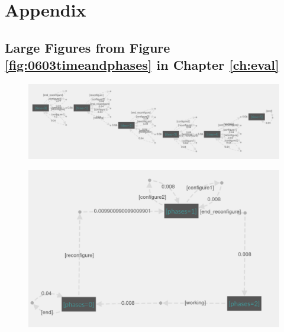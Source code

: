 \documentclass[preview]{standalone}
\begin{document}
\section{Appendix}
\subsection[Figures Large]{Large Figures from Figure \ref{fig:0603timeandphases} in Chapter \ref{ch:eval}}

\begin{figure}[!htb]
	\includegraphics[width=\textwidth]{./06/images/06_03_time.png}
\end{figure}

\begin{figure}[!htb]
	\includegraphics[width=\textwidth]{./06/images/06_03_phases.png}
\end{figure}

\pagebreak
\end{document}
